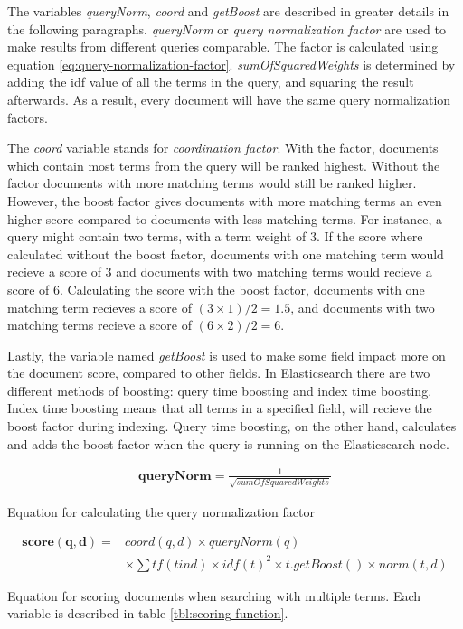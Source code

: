 The variables \textit{queryNorm}, \textit{coord} and \textit{getBoost} are described in greater details in the following paragraphs.
\textit{queryNorm} or \textit{query normalization factor} are used to make results from different queries comparable.
The factor is calculated using equation \ref{eq:query-normalization-factor}.
\textit{sumOfSquaredWeights} is determined by adding the idf value of all the terms in the query,
and squaring the result afterwards.
As a result, every document will have the same query normalization factors.

The \textit{coord} variable stands for \textit{coordination factor}.
With the factor, documents which contain most terms from the query will be ranked highest.
Without the factor documents with more matching terms would still be ranked higher.
However, the boost factor gives documents with more matching terms an even higher score compared to documents with less matching terms.
For instance, a query might contain two terms, with a term weight of 3.
If the score where calculated without the boost factor,
documents with one matching term would recieve a score of 3 and documents with two matching terms would recieve a score of 6.
Calculating the score with the boost factor, documents with one matching term recieves a score of $(3 \times 1)/ 2 = 1.5$,
and documents with two matching terms recieve a score of $(6 \times 2) / 2 = 6$.

Lastly, the variable named \textit{getBoost} is used to make some field impact more on the document score,
compared to other fields.
In Elasticsearch there are two different methods of boosting: query time boosting and index time boosting.
Index time boosting means that all terms in a specified field, will recieve the boost factor during indexing.
Query time boosting, on the other hand, calculates and adds the boost factor when the query is running on the Elasticsearch node.

\begin{cequation}
	\begin{equation}
		\begin{aligned}
			\mathbf{queryNorm} = \frac{1}{\sqrt{sumOfSquaredWeights}}
		\end{aligned}
	\end{equation}
	\caption{Equation for calculating the query normalization factor}
  \label{eq:query-normalization-factor}
\end{cequation}

\begin{cequation}
	\begin{equation}
		\begin{aligned}
			\mathbf{score(q,d)} = & coord(q,d) \times queryNorm(q) \\
														& \times \sum tf(t in d) \times idf(t)^2 \times t.getBoost() \times norm(t,d)
		\end{aligned}
	\end{equation}
	\caption{Equation for scoring documents when searching with multiple terms. Each variable is described in table \ref{tbl:scoring-function}.}
  \label{eq:scoring-function}
\end{cequation}


